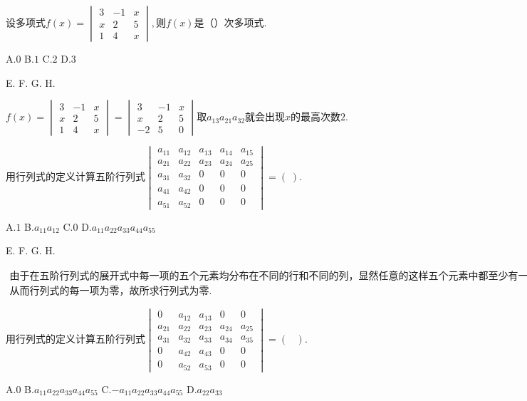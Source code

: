 $\mathrm{设多项式}f(x)=\begin{vmatrix}3&-1&x\\x&2&5\\1&4&x\end{vmatrix},则f(x)是（）\mathrm{次多项式}.$

A.$0$   B.$1$   C.$2$   D.$3$

E.   F.   G.   H.

$f(x)=\begin{vmatrix}3&-1&x\\x&2&5\\1&4&x\end{vmatrix}=\begin{vmatrix}3&-1&x\\x&2&5\\-2&5&0\end{vmatrix}取a_{13}a_{21}a_{32}\mathrm{就会出现}x\mathrm{的最高次数}2.$


$\mathrm{用行列式的定义计算五阶行列式}\begin{vmatrix}a_{11}&a_{12}&a_{13}&a_{14}&a_{15}\\a_{21}&a_{22}&a_{23}&a_{24}&a_{25}\\a_{31}&a_{32}&0&0&0\\a_{41}&a_{42}&0&0&0\\a_{51}&a_{52}&0&0&0\end{vmatrix}=(\;).$

A.$1$   B.$a_{11}a_{12}$   C.$0$   D.$a_{11}a_{22}a_{33}a_{44}a_{55}$

E.   F.   G.   H.

$\begin{array}{l}\mathrm{由于在五阶行列式的展开式中每一项的五个元素均分布在不同的行和不同的列}，\mathrm{显然任意的这样五个元素中都至少有一个为零}\\\mathrm{从而行列式的每一项为零}，\mathrm{故所求行列式为零}.\end{array}$


$\mathrm{用行列式的定义计算五阶行列式}\begin{vmatrix}0&a_{12}&a_{13}&0&0\\a_{21}&a_{22}&a_{23}&a_{24}&a_{25}\\a_{31}&a_{32}&a_{33}&a_{34}&a_{35}\\0&a_{42}&a_{43}&0&0\\0&a_{52}&a_{53}&0&0\end{vmatrix}=(\;\;\;).$

A.$0$   B.$a_{11}a_{22}a_{33}a_{44}a_{55}$   C.$-a_{11}a_{22}a_{33}a_{44}a_{55}$   D.$a_{22}a_{33}$

